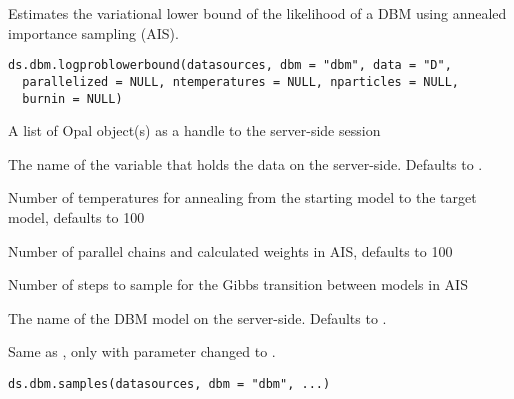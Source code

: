 %
\begin{Description}\relax
Estimates the variational lower bound of the likelihood of a DBM using
annealed importance sampling (AIS).
\end{Description}
%
\begin{Usage}
\begin{verbatim}
ds.dbm.logproblowerbound(datasources, dbm = "dbm", data = "D",
  parallelized = NULL, ntemperatures = NULL, nparticles = NULL,
  burnin = NULL)
\end{verbatim}
\end{Usage}
%
\begin{Arguments}
\begin{ldescription}
\item[\code{datasources}] A list of Opal object(s) as a handle to the server-side session

\item[\code{data}] The name of the variable that holds the data on the server-side.
Defaults to .

\item[\code{ntemperatures}] Number of temperatures for annealing from the starting model
to the target model, defaults to 100

\item[\code{nparticles}] Number of parallel chains and calculated weights in AIS, defaults to 100

\item[\code{burnin}] Number of steps to sample for the Gibbs transition between models in AIS

\item[\code{rbm}] The name of the DBM model on the server-side. Defaults to .
\end{ldescription}
\end{Arguments}
%
\begin{Description}\relax
Same as , only with parameter  changed to .
\end{Description}
%
\begin{Usage}
\begin{verbatim}
ds.dbm.samples(datasources, dbm = "dbm", ...)
\end{verbatim}
\end{Usage}
